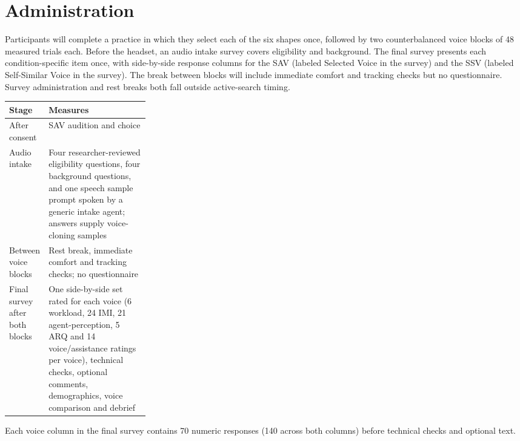 \section{Administration}
Participants will complete a practice in which they select each of the six shapes once, followed by two counterbalanced voice blocks of 48 measured trials each. Before the headset, an audio intake survey covers eligibility and background. The final survey presents each condition-specific item once, with side-by-side response columns for the SAV (labeled Selected Voice in the survey) and the SSV (labeled Self-Similar Voice in the survey). The break between blocks will include immediate comfort and tracking checks but no questionnaire. Survey administration and rest breaks both fall outside active-search timing.

\begin{tabularx}{\linewidth}{@{}p{0.27\linewidth}X@{}}\toprule
Stage & Measures \\\midrule
After consent & SAV audition and choice \\
Audio intake & Four researcher-reviewed eligibility questions, four background questions, and one speech sample prompt spoken by a generic intake agent; answers supply voice-cloning samples \\
Between voice blocks & Rest break, immediate comfort and tracking checks; no questionnaire \\
Final survey after both blocks & One side-by-side set rated for each voice (6 workload, 24 IMI, 21 agent-perception, 5 ARQ and 14 voice/assistance ratings per voice), technical checks, optional comments, demographics, voice comparison and debrief \\\bottomrule
\end{tabularx}
Each voice column in the final survey contains 70 numeric responses (140 across both columns) before technical checks and optional text.

